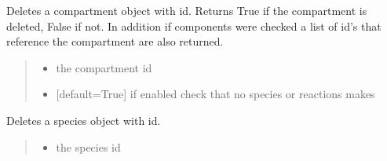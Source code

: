 \documentclass[letterpaper,12pt,english]{sphinxmanual}
\begin{document}
\begin{fulllineitems}
\begin{fulllineitems}
\begin{quote}
\begin{description}
\end{description}\end{quote}

\end{fulllineitems}


\begin{fulllineitems}
\label{\detokenize{api/core:cbmpy.CBModel.Model.deleteCompartment}}
\pysigstartsignatures
\pysiglinewithargsret
{}
{\sphinxparamcomma {}}
{}
\pysigstopsignatures
\sphinxAtStartPar
Deletes a compartment object with id. Returns True if the compartment is deleted, False if not. In addition if components were checked a list of id’s that reference the compartment are also returned.
\begin{quote}\begin{description}
\begin{itemize}
\item {} 
\sphinxAtStartPar
{} \textendash{} the compartment id

\item {} 
\sphinxAtStartPar
{} \textendash{} {[}default=True{]} if  enabled check that no species or reactions makes

\end{itemize}

\end{description}\end{quote}

\end{fulllineitems}


\begin{fulllineitems}
\label{\detokenize{api/core:cbmpy.CBModel.Model.deleteSpecies}}
\pysigstartsignatures
\pysiglinewithargsret
{}
{\sphinxparamcomma {}}
{}
\pysigstopsignatures
\sphinxAtStartPar
Deletes a species object with id.
\begin{quote}\begin{description}
\begin{itemize}
\item {} 
\sphinxAtStartPar
{} \textendash{} the species id


\end{itemize}
\end{description}
\end{quote}
\end{fulllineitems}
\end{fulllineitems}
\end{document}
